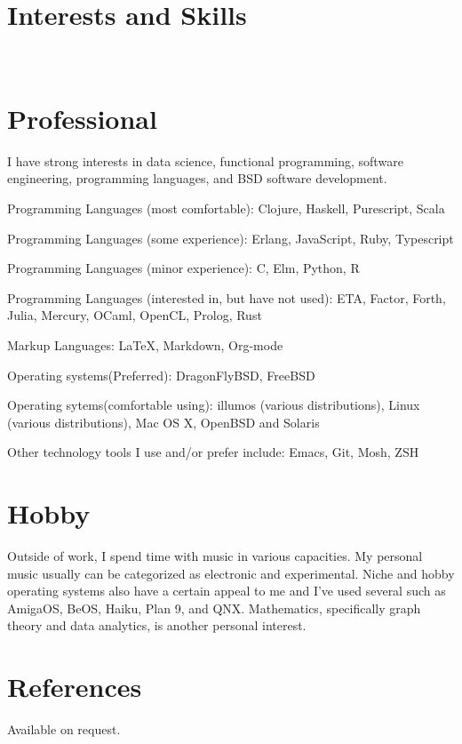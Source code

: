 \documentclass[margintitle,line]{res}
\renewcommand{\subsection}[1]{\section{\normalfont #1}}
\begin{document}
\begin{resume}



\section{Interests and Skills}
\ \\
\subsection{Professional}

I have strong interests in data science, functional programming,
software engineering, programming languages, and BSD software development.

Programming Languages (most comfortable): Clojure, Haskell, Purescript, Scala

Programming Languages (some experience): Erlang, JavaScript, Ruby, Typescript

Programming Languages (minor experience): C, Elm, Python, R

Programming Languages (interested in, but have not used): ETA, Factor, Forth, Julia, Mercury,
OCaml, OpenCL, Prolog, Rust

Markup Languages: LaTeX, Markdown, Org-mode

Operating systems(Preferred): DragonFlyBSD, FreeBSD

Operating sytems(comfortable using): illumos (various distributions),
Linux (various distributions), Mac OS X, OpenBSD and Solaris

Other technology tools I use and/or prefer include: Emacs, Git, Mosh, ZSH
\subsection{Hobby}

Outside of work, I spend time with music in various
capacities. My personal music usually can be categorized as electronic
and experimental. Niche and hobby operating systems also have a certain appeal
to me and I've used several such as AmigaOS, BeOS, Haiku, Plan 9, and QNX.
Mathematics, specifically graph theory and data analytics, is another personal interest.

\section{References}

Available on request.

\end{resume}
\end{document}
